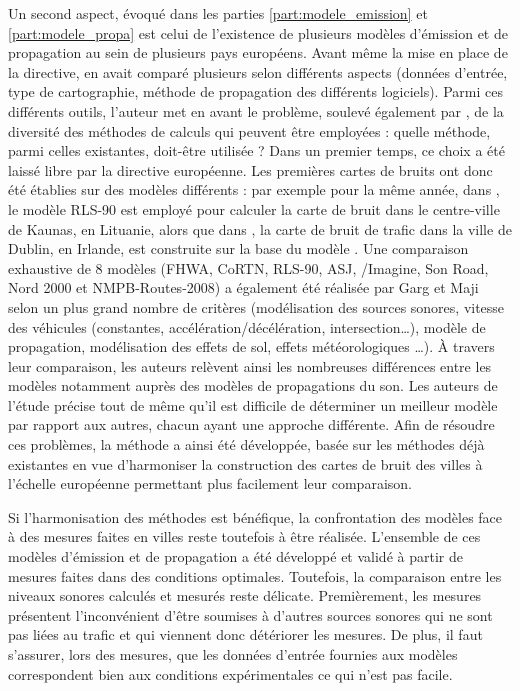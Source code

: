 Un second aspect, évoqué dans les parties \ref{part:modele_emission} et \ref{part:modele_propa} est celui de l'existence de plusieurs modèles d'émission et de propagation au sein de plusieurs pays européens. Avant même la mise en place de la directive, \cite{steele_critical_2001} en avait comparé plusieurs selon différents aspects (données d'entrée, type de cartographie, méthode de propagation des différents logiciels). 
Parmi ces différents outils, l'auteur met en avant le problème, soulevé également par \cite{king_implementation_2011}, de la diversité des méthodes de calculs qui peuvent être employées : quelle méthode, parmi celles existantes, doit-être utilisée ? 
Dans un premier temps, ce choix a été laissé libre par la directive européenne. Les premières cartes de bruits ont donc été établies sur des modèles différents : par exemple pour la même année, dans \cite{kliuvcininkas2006noise}, le modèle RLS-90 est employé pour calculer la carte de bruit dans le centre-ville de Kaunas, en Lituanie,  alors que dans \cite{murphy_environmental_2006}, la carte de bruit de trafic dans la ville de Dublin, en Irlande, est construite sur la base du modèle . 
Une comparaison exhaustive de 8 modèles (FHWA, CoRTN, RLS-90, ASJ, /Imagine, Son Road, Nord 2000 et NMPB-Routes-2008) a également été réalisée par Garg et Maji \cite{garg_critical_2014} selon un plus grand nombre de critères (modélisation des sources sonores, vitesse des véhicules (constantes, accélération/décélération, intersection\dots), modèle de propagation, modélisation des effets de sol, effets météorologiques \dots). À travers leur comparaison, les auteurs relèvent ainsi les nombreuses différences entre les modèles notamment auprès des modèles de propagations du son. Les auteurs de l'étude précise tout de même qu'il est difficile de déterminer un \og meilleur \fg{} modèle par rapport aux autres, chacun ayant une approche différente. 
Afin de résoudre ces problèmes, la méthode  \cite{CNOSSOS,kephalopoulos} a ainsi été développée, basée sur les méthodes déjà existantes en vue d'harmoniser la construction des cartes de bruit des villes à l'échelle européenne permettant plus facilement leur comparaison. 

Si l'harmonisation des méthodes est bénéfique, la confrontation des modèles face à des mesures faites en villes reste toutefois à être réalisée. L'ensemble de ces modèles d'émission et de propagation a été développé et validé à partir de mesures faites dans des conditions optimales. Toutefois, la comparaison entre les niveaux sonores calculés et mesurés reste délicate. Premièrement, les mesures présentent l'inconvénient d'être soumises à d'autres sources sonores qui ne sont pas liées au trafic et qui viennent donc détériorer les mesures. De plus, il faut s'assurer, lors des mesures, que les données d'entrée fournies aux modèles correspondent bien aux conditions expérimentales ce qui n'est pas facile.

